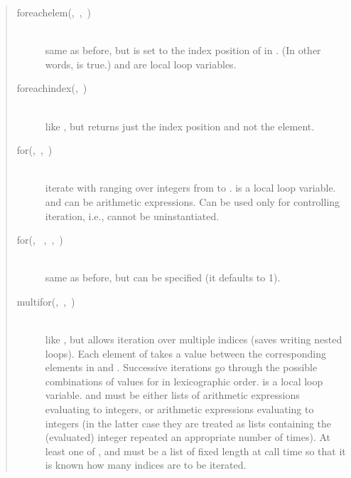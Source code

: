 \begin{quote}
\begin{description}
\item[foreachelem(,~,~)]%
\mbox{}\\
    same as before, but  is set to the index position of  in
    . (In other words,  is
    true.)
     and  are local loop variables.

\item[foreachindex(,~)]%
\mbox{}\\
    like , but returns just the index position and not
    the element.

\item[for(,~,~)]%
\mbox{}\\
    iterate  with  ranging over integers from
     to .
     is a local loop variable.
     and  can be arithmetic expressions.
    Can be used only for controlling iteration, i.e.,  cannot
    be uninstantiated.

\item[for(,%
~,~,~)]%
\mbox{}\\
    same as before, but  can be specified (it defaults to 1).

\item[multifor(,~,~)]%
\mbox{}\\
    like , but allows iteration over multiple indices (saves
    writing nested loops).  Each element of  takes a value
    between the corresponding elements in  and .
    Successive iterations go through the possible combinations of
    values for  in lexicographic order.   is a local
    loop variable.   and  must be either lists of
    arithmetic expressions evaluating to integers, or arithmetic
    expressions evaluating to integers (in the latter case they are
    treated as lists containing the (evaluated) integer repeated an
    appropriate number of times).  At least one of , 
    and
     must be a list of fixed length at call time so that it is
    known how many indices are to be iterated.


\end{description}
\end{quote}
